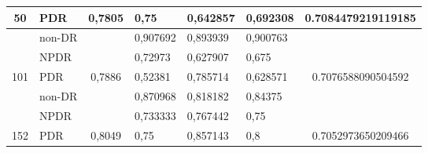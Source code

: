 \begin{table}[H]
\begin{center}
\begin{tabular}{|c|l|c|l|l|l|c|}
            \multirow{-3}{*}{50}  & PDR                                                & \multirow{-3}{*}{0,7805} & 0,75     & 0,642857 & 0,692308 & \multirow{-3}{*}{0.7084479219119185} \\ \hline
                                  & non-DR                                             &                          & 0,907692 & 0,893939 & 0,900763 &                                      \\ \cline{2-2} \cline{4-6}
                                  & NPDR                                               &                          & 0,72973  & 0,627907 & 0,675    &                                      \\ \cline{2-2} \cline{4-6}
            \multirow{-3}{*}{101} & PDR                                                & \multirow{-3}{*}{0,7886} & 0,52381  & 0,785714 & 0,628571 & \multirow{-3}{*}{0.7076588090504592} \\ \hline
                                  & non-DR                                             &                          & 0,870968 & 0,818182 & 0,84375  &                                      \\ \cline{2-2} \cline{4-6}
                                  & NPDR                                               &                          & 0,733333 & 0,767442 & 0,75     &                                      \\ \cline{2-2} \cline{4-6}
            \multirow{-3}{*}{152} & PDR                                                & \multirow{-3}{*}{0,8049} & 0,75     & 0,857143 & 0,8      & \multirow{-3}{*}{0.7052973650209466} \\ \hline
            \end{tabular}
        \end{center}
    \end{table}
